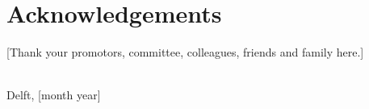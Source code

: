 \chapter*{Acknowledgements}

[Thank your promotors, committee, colleagues, friends and family here.]

\bigskip
\begin{flushright}
    \textit{\thesisauthorfirstnames\ \thesisauthorlastname} \\
    Delft, [month year]
\end{flushright}
